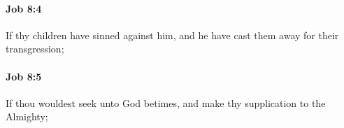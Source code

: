 		\paragraph{Job 8:4} %
			\label{JOB-8-4}

			If thy children have sinned against him, and he have cast them away for their transgression;


		\paragraph{Job 8:5} %
			\label{JOB-8-5}

			If thou wouldest seek unto God betimes, and make thy supplication to the Almighty;


